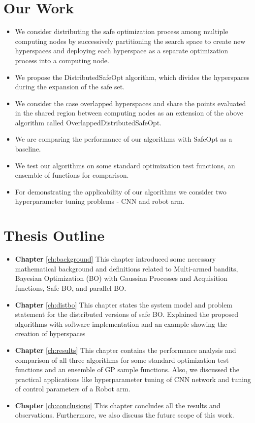 \section{Our Work}
\label{sec:our-contribution}
\begin{itemize}
	\item We consider distributing the safe optimization process among multiple computing nodes by successively partitioning the search space to create new hyperspaces and deploying each hyperspace as a separate optimization process into a computing node.
	\item We propose the DistributedSafeOpt algorithm, which divides the hyperspaces during the expansion of the safe set.
	\item We consider the case overlapped hyperspaces and share the points evaluated in the shared region between computing nodes as an extension of the above algorithm called OverlappedDistributedSafeOpt.
	\item We are comparing the performance of our algorithms with SafeOpt as a baseline.
	\item We test our algorithms on some standard optimization test functions, an ensemble of functions for comparison.
	\item For demonstrating the applicability of our algorithms we consider two hyperparameter tuning problems - CNN and robot arm.
\end{itemize}


\section{Thesis Outline}
\begin{itemize}
	\item \textbf{Chapter } \ref{ch:background} This chapter introduced some necessary mathematical background and definitions related to Multi-armed bandits, Bayesian Optimization (BO) with Gaussian Processes and Acquisition functions, Safe BO, and parallel BO.
	\item \textbf{Chapter } \ref{ch:distbo} This chapter states the system model and problem statement for the distributed versions of safe BO. Explained the proposed algorithms with software implementation and an example showing the creation of hyperspaces
	\item \textbf{Chapter } \ref{ch:results} This chapter contains the performance analysis and comparison of all three algorithms for some standard optimization test functions and an ensemble of GP sample functions. Also, we discussed the practical applications like hyperparameter tuning of CNN network and tuning of control parameters of a Robot arm.
	\item \textbf{Chapter } \ref{ch:conclusions} This chapter concludes all the results and observations. Furthermore, we also discuss the future scope of this work.
\end{itemize}
